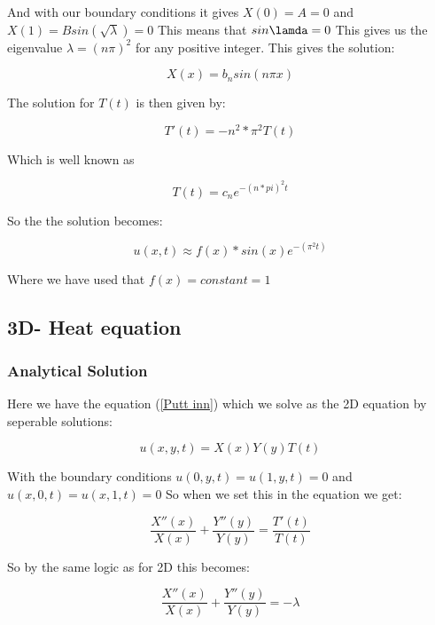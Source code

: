 \documentclass[a4paper,10pt]{article}
\begin{document}
And with our boundary conditions it gives $X(0) = A = 0$ and $X(1) = Bsin(\sqrt{\lambda}) = 0$
This means that $sin\lamda = 0$ This gives us the eigenvalue $\lambda = (n\pi)^2$ for any positive integer.
This gives the solution:

\begin{equation}
 X(x) = b_nsin(n\pi x)
\end{equation}

The solution for $T(t)$ is then given by:

\begin{equation}
 T'(t) = -n^2*\pi ^2 T(t)
\end{equation}

Which is well known as 

\begin{equation}
 T(t) = c_ne^{-(n*pi)^2t}
\end{equation}

So the the solution becomes:

\begin{equation}
 u(x,t) \approx f(x)*sin(x)e^{-(\pi^2t)}
 \end{equation}

 Where we have used that $f(x) = constant = 1$
 
 \subsection{3D- Heat equation}
\subsubsection{Analytical Solution}
Here we have the equation (\ref{Putt inn}) which we solve as the 2D equation by seperable solutions:

\begin{equation}
 u(x,y,t) = X(x)Y(y)T(t)
\end{equation}

With the boundary conditions $u(0,y,t) = u(1,y,t) = 0$ and $u(x,0,t) = u(x,1,t) = 0$
So when we set this in the equation we get:

\begin{equation}
 \frac{X''(x)}{X(x)} + \frac{Y''(y)}{Y(y)} = \frac{T'(t)}{T(t)} 
\end{equation}

So by the same logic as for 2D this becomes:

\begin{equation}
 \frac{X''(x)}{X(x)} + \frac{Y''(y)}{Y(y)} = -\lambda
\end{equation}
\end{document}
